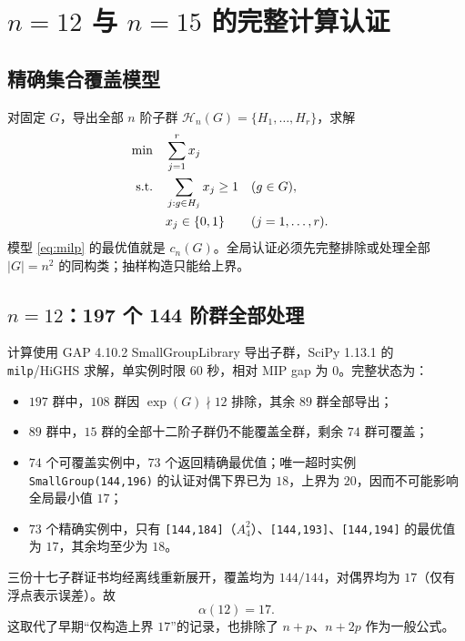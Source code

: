 \documentclass[11pt,a4paper]{article}
\numberwithin{equation}{section}
\theoremstyle{plain}
\theoremstyle{definition}
\theoremstyle{remark}
\newcommand{\calH}{\mathcal{H}}
\begin{document}
\section{\texorpdfstring{$n=12$}{n=12} 与 \texorpdfstring{$n=15$}{n=15} 的完整计算认证}
\subsection{精确集合覆盖模型}
对固定 $G$，导出全部 $n$ 阶子群 $\calH_n(G)=\{H_1,\dots,H_r\}$，求解
\begin{align}
 \min\quad &\sum_{j=1}^{r}x_j \notag\\
 \text{s.t.}\quad &\sum_{j:g\in H_j}x_j\ge1 &&(g\in G),\label{eq:milp}\\
 &x_j\in\{0,1\}&&(j=1,\dots,r).\notag
\end{align}
模型 \eqref{eq:milp} 的最优值就是 $c_n(G)$。全局认证必须先完整排除或处理全部 $|G|=n^2$ 的同构类；抽样构造只能给上界。

\subsection{\texorpdfstring{$n=12$}{n=12}：197 个 144 阶群全部处理}
计算使用 GAP 4.10.2 SmallGroupLibrary 导出子群，SciPy 1.13.1 的 \texttt{milp}/HiGHS 求解，单实例时限 $60$ 秒，相对 MIP gap 为 $0$。完整状态为：
\begin{itemize}
 \item $197$ 群中，$108$ 群因 $\exp(G)\nmid12$ 排除，其余 $89$ 群全部导出；
 \item $89$ 群中，$15$ 群的全部十二阶子群仍不能覆盖全群，剩余 $74$ 群可覆盖；
 \item $74$ 个可覆盖实例中，$73$ 个返回精确最优值；唯一超时实例 \texttt{SmallGroup(144,196)} 的认证对偶下界已为 $18$，上界为 $20$，因而不可能影响全局最小值 $17$；
 \item $73$ 个精确实例中，只有 \texttt{[144,184]}（$A_4^2$）、\texttt{[144,193]}、\texttt{[144,194]} 的最优值为 $17$，其余均至少为 $18$。
\end{itemize}
三份十七子群证书均经离线重新展开，覆盖均为 $144/144$，对偶界均为 $17$（仅有浮点表示误差）。故
\begin{equation}\label{eq:n12-exact}
 \boxed{\alpha(12)=17.}
\end{equation}
这取代了早期“仅构造上界 $17$”的记录，也排除了 $n+p$、$n+2p$ 作为一般公式。
\end{document}
